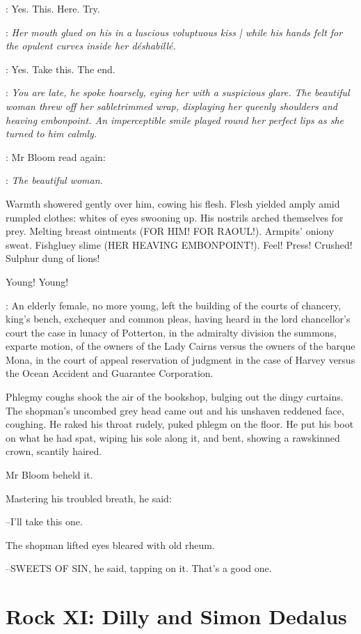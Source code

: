 \BloomInt:
Yes.
This.
Here.
Try.

\BloomInt:
\emph{Her mouth glued on his in a luscious voluptuous kiss |
while his hands felt for the opulent curves inside her déshabillé.}

\BloomInt:
Yes.
Take this.
The end.

\BloomInt:
\emph{You are late,
he spoke hoarsely,
eying her with a suspicious glare.
The beautiful woman threw off her sabletrimmed wrap,
displaying her queenly shoulders and heaving embonpoint.
An imperceptible smile played round her perfect lips
as she turned to him calmly.}

:
Mr Bloom read again:

\BloomInt:
\emph{The beautiful woman.}

Warmth showered gently over him,
cowing his flesh.
Flesh yielded amply amid rumpled clothes:
whites of eyes swooning up.
His nostrils arched themselves for prey.
Melting breast ointments
(FOR HIM!
FOR RAOUL!).
Armpits' oniony sweat.
Fishgluey slime
(HER HEAVING EMBONPOINT!).
Feel!
Press!
Crushed!
Sulphur dung of lions!

Young!
Young!

:
An elderly female,
no more young,
left the building of the courts of
chancery,
king's bench,
exchequer
and common pleas,
having heard in the
lord chancellor's court
the case in lunacy of Potterton,
in the admiralty
division
the summons, exparte motion,
of the owners of the Lady Cairns
versus the owners of the barque Mona,
in the court of appeal reservation
of judgment
in the case of Harvey versus
the Ocean Accident and Guarantee Corporation.

Phlegmy coughs shook the air of the bookshop,
bulging out the dingy curtains.
The shopman's uncombed grey head came out
and his unshaven reddened face,
coughing.
He raked his throat rudely,
puked phlegm on the floor.
He put his boot on what he had spat,
wiping his sole along it,
and bent,
showing a rawskinned crown,
scantily haired.

Mr Bloom beheld it.

Mastering his troubled breath,
he said:

--I'll take this one.

The shopman lifted eyes
bleared with old rheum.

--SWEETS OF SIN,
he said,
tapping on it.
That's a good one.


\section*{Rock XI: Dilly and Simon Dedalus}


